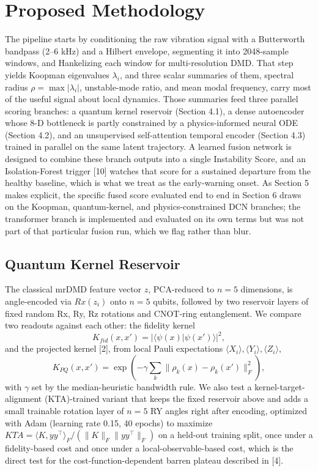 \documentclass[3p,times,procedia]{elsarticle}
\begin{document}
\section{Proposed Methodology}
The pipeline starts by conditioning the raw vibration signal with a Butterworth bandpass (2--6 kHz) and a Hilbert envelope, segmenting it into 2048-sample windows, and Hankelizing each window for multi-resolution DMD. That step yields Koopman eigenvalues $\lambda_i$, and three scalar summaries of them, spectral radius $\rho = \max|\lambda_i|$, unstable-mode ratio, and mean modal frequency, carry most of the useful signal about local dynamics. Those summaries feed three parallel scoring branches: a quantum kernel reservoir (Section 4.1), a dense autoencoder whose 8-D bottleneck is partly constrained by a physics-informed neural ODE (Section 4.2), and an unsupervised self-attention temporal encoder (Section 4.3) trained in parallel on the same latent trajectory. A learned fusion network is designed to combine these branch outputs into a single Instability Score, and an Isolation-Forest trigger [10] watches that score for a sustained departure from the healthy baseline, which is what we treat as the early-warning onset. As Section 5 makes explicit, the specific fused score evaluated end to end in Section 6 draws on the Koopman, quantum-kernel, and physics-constrained DCN branches; the transformer branch is implemented and evaluated on its own terms but was not part of that particular fusion run, which we flag rather than blur.

\subsection{Quantum Kernel Reservoir}
The classical mrDMD feature vector $z$, PCA-reduced to $n=5$ dimensions, is angle-encoded via $Rx(z_i)$ onto $n=5$ qubits, followed by two reservoir layers of fixed random Rx, Ry, Rz rotations and CNOT-ring entanglement. We compare two readouts against each other: the fidelity kernel
\begin{equation}
K_{fid}(x, x') = |\langle \psi(x) | \psi(x') \rangle|^2,
\end{equation}
and the projected kernel [2], from local Pauli expectations $\langle X_i \rangle, \langle Y_i \rangle, \langle Z_i \rangle$,
\begin{equation}
K_{PQ}(x, x') = \exp \left( -\gamma \sum_k \|\rho_k(x) - \rho_k(x')\|_F^2 \right),
\end{equation}
with $\gamma$ set by the median-heuristic bandwidth rule. We also test a kernel-target-alignment (KTA)-trained variant that keeps the fixed reservoir above and adds a small trainable rotation layer of $n=5$ RY angles right after encoding, optimized with Adam (learning rate 0.15, 40 epochs) to maximize $KTA = \langle K, yy^\top \rangle_F / (\|K\|_F \|yy^\top\|_F)$ on a held-out training split, once under a fidelity-based cost and once under a local-observable-based cost, which is the direct test for the cost-function-dependent barren plateau described in [4].
\end{document}
